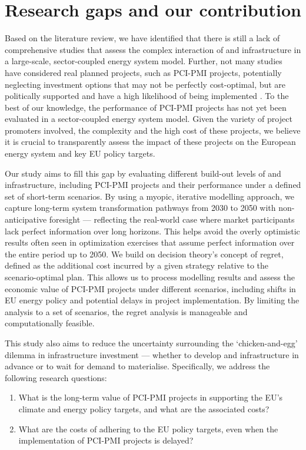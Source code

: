 \documentclass[final,5p,times,twocolumn,sort&compress]{elsarticle}
\begin{document}
\section{Research gaps and our contribution}
Based on the literature review, we have identified that there is still a lack of comprehensive studies that assess the complex interaction of  and  infrastructure in a large-scale, sector-coupled energy system model. Further, not many studies have considered real planned projects, such as PCI-PMI projects, potentially neglecting investment options that may not be perfectly cost-optimal, but are politically supported and have a high likelihood of being implemented \cite{greevenbroekLittleLoseCase2024,trutnevyteDoesCostOptimization2016}. To the best of our knowledge, the performance of PCI-PMI projects has not yet been evaluated in a sector-coupled energy system model. Given the variety of project promoters involved, the complexity and the high cost of these projects, we believe it is crucial to transparently assess the impact of these projects on the European energy system and key EU policy targets.

Our study aims to fill this gap by evaluating different build-out levels of  and  infrastructure, including PCI-PMI projects and their performance under a defined set of short-term scenarios. By using a myopic, iterative modelling approach, we capture long-term system transformation pathways from 2030 to 2050 with non-anticipative foresight --- reflecting the real-world case where market participants lack perfect information over long horizons. This helps avoid the overly optimistic results often seen in optimization exercises that assume perfect information over the entire period up to 2050.
We build on decision theory’s concept of regret, defined as the additional cost incurred by a given strategy relative to the scenario-optimal plan. This allows us to process modelling results and assess the economic value of PCI-PMI projects under different scenarios, including shifts in EU energy policy and potential delays in project implementation. By limiting the analysis to a set of scenarios, the regret analysis is manageable and computationally feasible.

This study also aims to reduce the uncertainty surrounding the `chicken-and-egg' dilemma in infrastructure investment --- whether to develop  and  infrastructure in advance or to wait for demand to materialise. Specifically, we address the following research questions:
\begin{enumerate} 
  \item What is the long-term value of PCI-PMI projects in supporting the EU’s climate and energy policy targets, and what are the associated costs?
  \item What are the costs of adhering to the EU policy targets, even when the implementation of PCI-PMI projects is delayed?
\end{enumerate}
\end{document}
